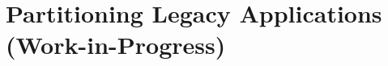 \declarecommand{\sysname}{\civet{}}

\chapter{Partitioning Legacy \java{} Applications\\ (Work-in-Progress)}
\label{chap:civet}







%

